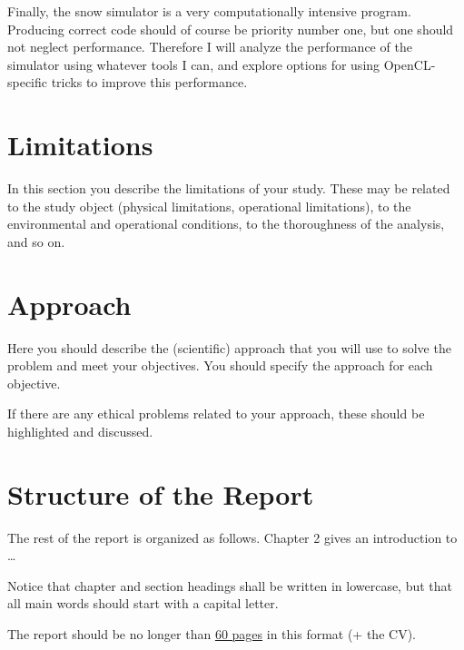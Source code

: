 Finally, the snow simulator is a very computationally intensive program. Producing correct code should of course be priority number one, but one should not neglect performance. Therefore I will analyze the performance of the simulator using whatever tools I can, and explore options for using OpenCL-specific tricks to improve this performance.

\section{Limitations}
In this section you describe the limitations of your study. These may be related to the study object (physical limitations, operational limitations), to the environmental and operational conditions, to the thoroughness of the analysis, and so on.
\section{Approach}
Here you should describe the (scientific) approach that you will use to solve the problem and meet your objectives. You should specify the approach for each objective.

If there are any ethical problems related to your approach, these should be highlighted and discussed.
\section{Structure of the Report}
The rest of the report is organized as follows. Chapter 2 gives an introduction to \ldots

\begin{remark}
Notice that chapter and section headings shall be written in lowercase, but that all main words should start with a capital letter.
\end{remark}


The report should be no longer than \underline{60 pages} in this format (+ the CV).